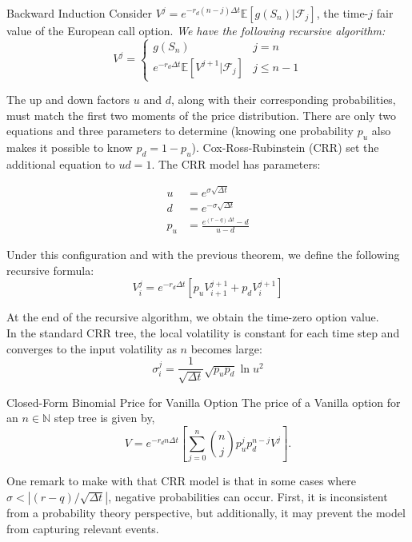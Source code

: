 \begin{thm}{Backward Induction}{}
	Consider $V^j = e^{-r_d (n-j) \Delta t} \mathbb{E}[g(S_n) | \mathcal{F}_j]$, the time-$j$ fair value of the European call option. \emph{We have the following recursive algorithm:}
	\[
		V^j =
		\begin{cases}
			g(S_n)                                                & j = n      \\
			e^{-r_d \Delta t} \mathbb{E}[V^{j+1} | \mathcal{F}_j] & j \leq n-1
		\end{cases}
	\]
\end{thm}

The up and down factors $u$ and $d$, along with their corresponding probabilities, must match the first two moments of the price distribution. There are only two equations and three parameters to determine (knowing one probability $p_u$ also makes it possible to know $p_d = 1-p_u$). Cox-Ross-Rubinstein (CRR) set the additional equation to $ud = 1$. The CRR model has parameters:

\begin{align}
	u   & = e^{\sigma \sqrt{\Delta t}}          \\
	d   & = e^{-\sigma \sqrt{\Delta t}}         \\
	p_u & = \frac{e^{(r-q)\Delta t} - d}{u - d}
\end{align}

Under this configuration and with the previous theorem, we define the following recursive formula:
\begin{equation}
	V^j_i = e^{-r_d \Delta t} \left[ p_u V^{j+1}_{i+1} + p_d V^{j+1}_i \right]
\end{equation}

At the end of the recursive algorithm, we obtain the time-zero option value.\\
In the standard CRR tree, the local volatility is constant for each time step and converges to the input volatility as $n$ becomes large:
\begin{equation}
	\sigma^{j}_i = \frac{1}{\sqrt{\Delta t}} \sqrt{p_u p_d} \ln u^2
\end{equation}

\begin{thm}{Closed-Form Binomial Price for Vanilla Option}{}
	The price of a Vanilla option for an $n \in \mathbb{N}$ step tree is given by,
	\[
		V = e^{-r_d n \Delta t} \left[ \sum_{j=0}^{n} \binom{n}{j} p_u^j p_d^{n-j} V^j \right].
	\]
\end{thm}
\begin{xattention}
	One remark to make with that CRR model is that in some cases where $\sigma < |(r-q)/\sqrt{\Delta t}|$, negative probabilities can occur. First, it is inconsistent from a probability theory perspective, but additionally, it may prevent the model from capturing relevant events.
\end{xattention}

